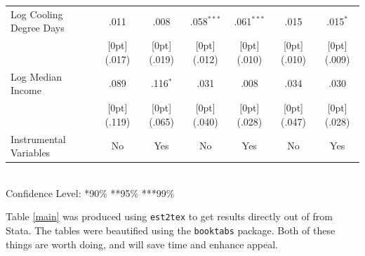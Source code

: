 \documentclass[10pt]{article}
\begin{document}
\begin{table}[h!]
\begin{tabular*}{\textwidth}{@{\extracolsep{\fill}}lcccccc}
Log Cooling Degree Days &   .011 &  .008 &  .058$^{***}$ &  .061$^{***}$ &  .015 &  .015$^{*}$ \\
&   \raisebox{.7ex}[0pt]{\scriptsize (.017)} &  \raisebox{.7ex}[0pt]{\scriptsize (.019)} &  \raisebox{.7ex}[0pt]{\scriptsize (.012)} &  \raisebox{.7ex}[0pt]{\scriptsize (.010)} &  \raisebox{.7ex}[0pt]{\scriptsize (.010)} &  \raisebox{.7ex}[0pt]{\scriptsize (.009)} \\
Log Median Income & .089 &  .116$^{*}$ &    .031 &  .008 &  .034 &  .030 \\
&   \raisebox{.7ex}[0pt]{\scriptsize (.119)} &  \raisebox{.7ex}[0pt]{\scriptsize (.065)} &  \raisebox{.7ex}[0pt]{\scriptsize (.040)} &  \raisebox{.7ex}[0pt]{\scriptsize (.028)} &  \raisebox{.7ex}[0pt]{\scriptsize (.047)} &  \raisebox{.7ex}[0pt]{\scriptsize (.028)} \\
\midrule
Instrumental Variables & No & Yes &No&Yes&No&Yes\\
\bottomrule     
\end{tabular*}%
\\Confidence Level: *90\% **95\% ***99\%    
\end{table}

Table \ref{main} was produced using \texttt{est2tex} to get results directly out of from Stata.  The tables were beautified using the \texttt{booktabs} package.  Both of these things are worth doing, and will save time and enhance appeal.



\end{document}
